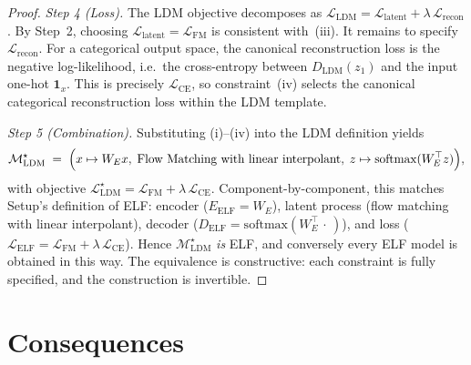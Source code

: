\documentclass[11pt]{article}
\begin{document}
\begin{proof}
\smallskip
\noindent\emph{Step 4 (Loss).}
The LDM objective decomposes as
$\mathcal{L}_{\mathrm{LDM}} = \mathcal{L}_{\mathrm{latent}} + \lambda\,\mathcal{L}_{\mathrm{recon}}$.
By Step~2, choosing $\mathcal{L}_{\mathrm{latent}} = \mathcal{L}_{\mathrm{FM}}$
is consistent with~(iii). It remains to specify $\mathcal{L}_{\mathrm{recon}}$.
For a categorical output space, the canonical reconstruction loss is the
negative log-likelihood, i.e.\ the cross-entropy between $D_{\mathrm{LDM}}(z_{1})$
and the input one-hot $\mathbf{1}_{x}$. This is precisely
$\mathcal{L}_{\mathrm{CE}}$, so constraint~(iv) selects the canonical
categorical reconstruction loss within the LDM template.

\smallskip
\noindent\emph{Step 5 (Combination).}
Substituting (i)--(iv) into the LDM definition yields
\[
  \mathcal{M}_{\mathrm{LDM}}^{\star}
  \;=\;
  \Bigl( x\mapsto W_{E}x,\; \text{Flow Matching with linear interpolant},\;
         z\mapsto\mathrm{softmax}(W_{E}^{\top}z) \Bigr),
\]
with objective
$\mathcal{L}_{\mathrm{LDM}}^{\star} = \mathcal{L}_{\mathrm{FM}} + \lambda\,\mathcal{L}_{\mathrm{CE}}$.
Component-by-component, this matches Setup's definition of ELF:
encoder ($E_{\mathrm{ELF}} = W_{E}$), latent process (flow matching with
linear interpolant), decoder ($D_{\mathrm{ELF}} = \mathrm{softmax}(W_{E}^{\top}\,\cdot\,)$),
and loss ($\mathcal{L}_{\mathrm{ELF}} = \mathcal{L}_{\mathrm{FM}} + \lambda\,\mathcal{L}_{\mathrm{CE}}$).
Hence $\mathcal{M}_{\mathrm{LDM}}^{\star}$ \emph{is} ELF, and conversely
every ELF model is obtained in this way. The equivalence is constructive:
each constraint is fully specified, and the construction is invertible.
\end{proof}

\section*{Consequences}
\end{document}
